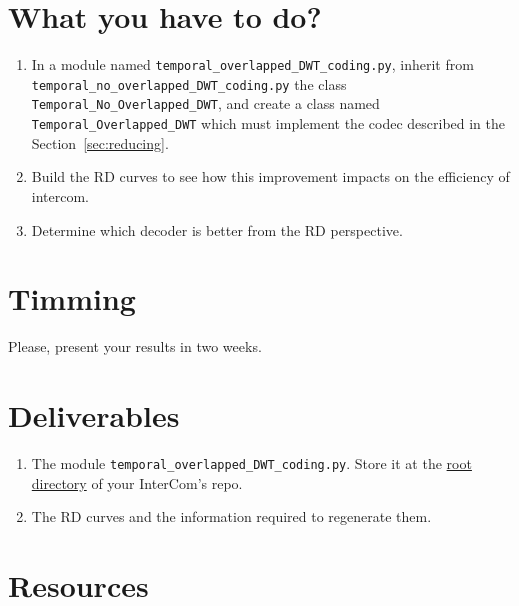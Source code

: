 
\section{What you have to do?}

\begin{enumerate}
\item In a module named \verb|temporal_overlapped_DWT_coding.py|,
  inherit from \verb|temporal_no_overlapped_DWT_coding.py| the class
  \verb|Temporal_No_Overlapped_DWT|, and create a class named
  \verb|Temporal_Overlapped_DWT| which must implement the codec
  described in the Section~\ref{sec:reducing}.
\item Build the RD curves to see how this improvement impacts on the
  efficiency of intercom.
\item Determine which decoder is better from the RD perspective.
\end{enumerate}

\section{Timming}

Please, present your results in two weeks.

\section{Deliverables}

\begin{enumerate}
\item The module \verb|temporal_overlapped_DWT_coding.py|. Store it at
  the \href{https://github.com/Tecnologias-multimedia/intercom}{root
    directory} of your InterCom's repo.
\item The RD curves and the information required to regenerate them.
\end{enumerate}
  
\section{Resources}


